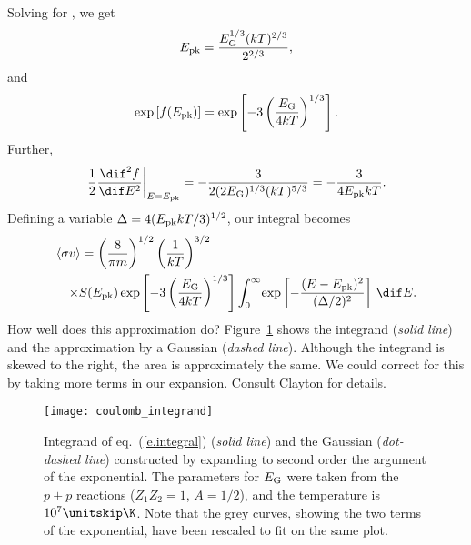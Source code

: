 Solving for \Epk, we get
\[
E_{\mathrm{pk}} = \frac{E_{\mathrm{G}}^{1/3}(kT)^{2/3}}{2^{2/3}},
\]
and 
\[ \exp\left[f(E_{\mathrm{pk}})\right] = \exp\left[-3\left(\frac{E_{\mathrm{G}}}{4kT}\right)^{1/3}\right].
\]
Further,
\[
\left.\frac{1}{2}\frac{\dif^{2}f}{\dif E^{2}}\right|_{E=\Epk} = -\frac{3}{2(2\EG)^{1/3}(kT)^{5/3}} = -\frac{3}{4\Epk kT}.
\]
Defining a variable $\Delta = 4(E_{\mathrm{pk}} kT/3)^{1/2}$, our integral becomes
\begin{eqnarray}\label{e.integral2}
\lefteqn{\langle\sigma v\rangle = \left(\frac{8}{\pi m}\right)^{1/2}\left(\frac{1}{kT}\right)^{3/2}}\nonumber\\
&&\times S(\Epk)
  \exp\left[-3\left(\frac{\EG}{4kT}\right)^{1/3}\right]
  \int_{0}^{\infty}\!\exp\left[-\frac{(E-\Epk)^{2}}{(\Delta/2)^{2}}\right]\,\dif E.
\end{eqnarray}
How well does this approximation do?  Figure~\ref{f.integrand} shows the integrand (\emph{solid line}) and the approximation by a Gaussian (\emph{dashed line}).  Although the integrand is skewed to the right, the area is approximately the same.  We could correct for this by taking more terms in our expansion. Consult Clayton for details.

\begin{figure}[htbp]
\texttt{[image: coulomb\_integrand]}
\caption[Competition between Boltzmann factor and penetration of Coulomb barrier in setting the thermally-averaged reaction rate.]{Integrand of eq.~(\protect\ref{e.integral}) (\emph{solid line}) and the Gaussian (\emph{dot-dashed line}) constructed by expanding to second order the argument of the exponential. The parameters for $E_{\mathrm{G}}$ were taken from the $p+p$ reactions ($Z_{1}Z_{2}=1$, $A = 1/2$), and the temperature is $10^{7}\nsp\K$.  Note that the grey curves, showing the two terms of the exponential, have been rescaled to fit on the same plot.}
\label{f.integrand}
\end{figure}

